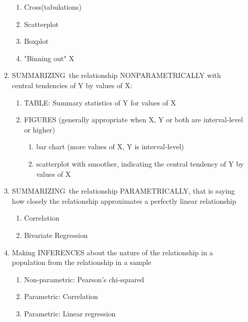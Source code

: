 \documentclass[11pt]{article}
\begin{document}
\begin{itemize}
\begin{enumerate}
\begin{enumerate}
\item Cross(tabulations)

\item Scatterplot

\item Boxplot

\item "Binning out" X
\end{enumerate}

\item SUMMARIZING\ the relationship NONPARAMETRICALLY with central
tendencies of Y by values of X:

\begin{enumerate}
\item TABLE: Summary statistics of Y for values of X

\item FIGURES (generally appropriate when X, Y or both are interval-level or
higher)

\begin{enumerate}
\item bar chart (more values of X, Y is interval-level)

\item scatterplot with smoother, indicating the central tendency of Y by
values of X
\end{enumerate}
\end{enumerate}

\item SUMMARIZING\ the relationship PARAMETRICALLY, that is saying how
closely the relationship approximates a perfectly linear relationship

\begin{enumerate}
\item Correlation

\item Bivariate Regression
\end{enumerate}

\item Making INFERENCES about the nature of the relationship in a population
from the relationship in a sample

\begin{enumerate}
\item Non-parametric: Pearson's chi-squared

\item Parametric: Correlation

\item Parametric: Linear regression
\end{enumerate}
\end{enumerate}


\end{itemize}
\end{document}
